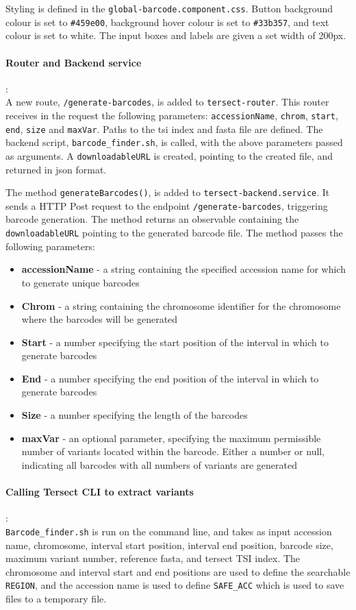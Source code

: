 \documentclass[12pt]{article}
\begin{document}
Styling is defined in the \verb+global-barcode.component.css+. Button background colour is set to \verb+#459e00+, background hover colour is set to \verb+#33b357+, and text colour is set to white. The input boxes and labels are given a set width of 200px. 

\paragraph{Router and Backend service}:\\
A new route, \verb+/generate-barcodes+, is added to \verb+tersect-router+. This router receives in the request the following parameters: \verb+accessionName+, \verb+chrom+, \verb+start+, \verb+end+, \verb+size+ and \verb+maxVar+. Paths to the tsi index and fasta file are defined. The backend script, \verb+barcode_finder.sh+, is called, with the above parameters passed as arguments. A \verb+downloadableURL+ is created, pointing to the created file, and returned in json format.  

The method \verb+generateBarcodes()+, is added to \verb+tersect-backend.service+. It sends a HTTP Post request to the endpoint \verb+/generate-barcodes+, triggering barcode generation. The method returns an observable containing the \verb+downloadableURL+ pointing to the generated barcode file. The method passes the following parameters: 
\begin{itemize}
    \item \textbf{accessionName} - a string containing the specified accession name for which to generate unique barcodes 
    \item \textbf{Chrom} - a string containing the chromosome identifier for the chromosome where the barcodes will be generated 
    \item \textbf{Start} - a number specifying the start position of the interval in which to generate barcodes 
    \item \textbf{End} - a number specifying the end position of the interval in which to generate barcodes 
    \item \textbf{Size} - a number specifying the length of the barcodes 
    \item \textbf{maxVar} - an optional parameter, specifying the maximum permissible number of variants located within the barcode. Either a number or null, indicating all barcodes with all numbers of variants are generated
\end{itemize}


\paragraph{Calling Tersect CLI to extract variants}: \\
\verb+Barcode_finder.sh+ is run on the command line, and takes as input accession name, chromosome, interval start position, interval end position, barcode size, maximum variant number, reference fasta, and tersect TSI index. The chromosome and interval start and end positions are used to define the searchable \verb+REGION+, and the accession name is used to define \verb+SAFE_ACC+ which is used to save files to a temporary file.  
\end{document}
